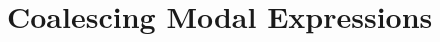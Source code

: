 \documentclass[a4paper,fleqn,envcountsame,orivec]{llncs}
\def\tlnote{\ednote{TL}}
\begin{document}


\section{Coalescing Modal Expressions}
\label{sec:coalescing-modal}
\end{document}
